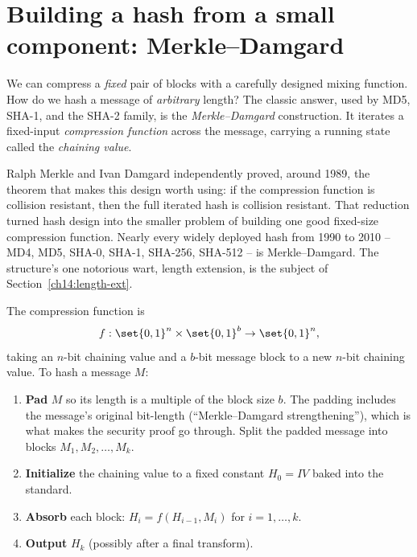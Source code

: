 \section{Building a hash from a small component: Merkle--Damgard}
\label{ch14:md}

We can compress a \emph{fixed} pair of blocks with a carefully designed mixing function. How do we hash a message of \emph{arbitrary} length? The classic answer, used by MD5, SHA-1, and the SHA-2 family, is the \emph{Merkle--Damgard} construction. It iterates a fixed-input \emph{compression function} across the message, carrying a running state called the \emph{chaining value}.

\begin{historybox}
Ralph Merkle and Ivan Damgard independently proved, around 1989, the theorem that makes this design worth using: if the compression function is collision resistant, then the full iterated hash is collision resistant. That reduction turned hash design into the smaller problem of building one good fixed-size compression function. Nearly every widely deployed hash from 1990 to 2010 -- MD4, MD5, SHA-0, SHA-1, SHA-256, SHA-512 -- is Merkle--Damgard. The structure's one notorious wart, length extension, is the subject of Section~\ref{ch14:length-ext}.
\end{historybox}

The compression function is
\[
  f : \set{0,1}^{n} \times \set{0,1}^{b} \to \set{0,1}^{n},
\]
taking an $n$-bit chaining value and a $b$-bit message block to a new $n$-bit chaining value. To hash a message $M$:

\begin{enumerate}
  \item \textbf{Pad} $M$ so its length is a multiple of the block size $b$. The padding includes the message's original bit-length (``Merkle--Damgard strengthening''), which is what makes the security proof go through. Split the padded message into blocks $M_1, M_2, \dots, M_k$.
  \item \textbf{Initialize} the chaining value to a fixed constant $H_0 = \mathit{IV}$ baked into the standard.
  \item \textbf{Absorb} each block: $H_i = f(H_{i-1}, M_i)$ for $i = 1, \dots, k$.
  \item \textbf{Output} $H_k$ (possibly after a final transform).
\end{enumerate}

